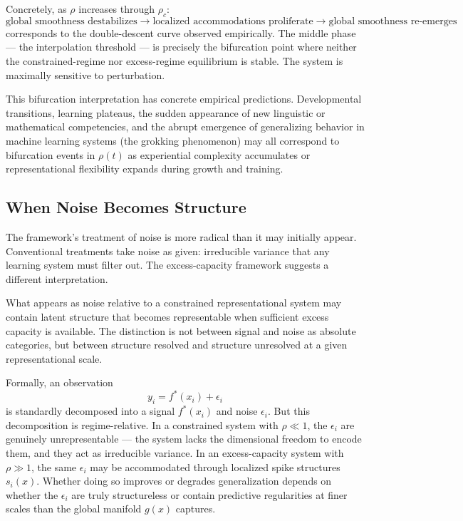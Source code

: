 \documentclass[12pt,a4paper]{article}
\begin{document}
Concretely, as $\rho$ increases through $\rho_c$:
\[
\text{global smoothness destabilizes} \rightarrow \text{localized accommodations proliferate} \rightarrow \text{global smoothness re-emerges}
\]
corresponds to the double-descent curve observed empirically. The middle phase --- the interpolation threshold --- is precisely the bifurcation point where neither the constrained-regime nor excess-regime equilibrium is stable. The system is maximally sensitive to perturbation.

This bifurcation interpretation has concrete empirical predictions. Developmental transitions, learning plateaus, the sudden appearance of new linguistic or mathematical competencies, and the abrupt emergence of generalizing behavior in machine learning systems (the grokking phenomenon) may all correspond to bifurcation events in $\rho(t)$ as experiential complexity accumulates or representational flexibility expands during growth and training.

\subsection{When Noise Becomes Structure}

The framework's treatment of noise is more radical than it may initially appear. Conventional treatments take noise as given: irreducible variance that any learning system must filter out. The excess-capacity framework suggests a different interpretation.

What appears as noise relative to a constrained representational system may contain latent structure that becomes representable when sufficient excess capacity is available. The distinction is not between signal and noise as absolute categories, but between structure resolved and structure unresolved at a given representational scale.

Formally, an observation
\[
y_i = f^*(x_i) + \epsilon_i
\]
is standardly decomposed into a signal $f^*(x_i)$ and noise $\epsilon_i$. But this decomposition is regime-relative. In a constrained system with $\rho \ll 1$, the $\epsilon_i$ are genuinely unrepresentable --- the system lacks the dimensional freedom to encode them, and they act as irreducible variance. In an excess-capacity system with $\rho \gg 1$, the same $\epsilon_i$ may be accommodated through localized spike structures $s_i(x)$. Whether doing so improves or degrades generalization depends on whether the $\epsilon_i$ are truly structureless or contain predictive regularities at finer scales than the global manifold $g(x)$ captures.
\end{document}
